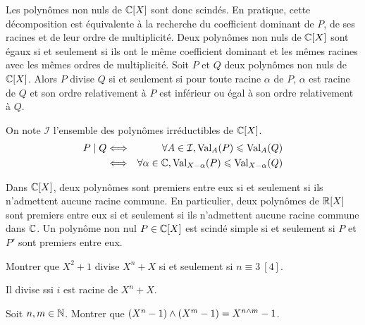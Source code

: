 \documentclass{magnolia}
\begin{document}
\begin{remarques}
\remarque Les polynômes non nuls de $\polyC$ sont donc scindés.
  \remarque En pratique, cette décomposition est équivalente à la recherche du
  coefficient dominant de $P$, de ses racines et de leur ordre de
  multiplicité.
  \remarque Deux polynômes non nuls de $\polyC$ sont égaux si et seulement si ils ont
  le même coefficient dominant et les mêmes racines avec les mêmes ordres de
  multiplicité.
\remarque Soit $P$ et $Q$ deux polynômes non nuls de $\polyC$. Alors $P$ divise
  $Q$ si et seulement si pour toute racine $\alpha$ de $P$, $\alpha$ est racine
  de $Q$ et son ordre relativement à $P$ est inférieur ou égal à son ordre
  relativement à $Q$.
  \begin{preuve} On note $\mathcal{I}$ l'ensemble des polynômes irréductibles de $\polyC$.
  \begin{eqnarray*}
  P\mid Q &\Longleftrightarrow & \forall A\in \mathcal{I}, {\rm Val}_A(P)\leqslant {\rm Val}_A(Q)\\
  &\Longleftrightarrow & \forall \alpha\in\mathbb{C}, {\rm Val}_{X-\alpha}(P)\leqslant {\rm Val}_{X-\alpha}(Q)
  \end{eqnarray*}
  \end{preuve}
\remarque Dans $\polyC$, deux polynômes sont premiers entre eux si
  et seulement si ils n'admettent aucune racine commune. En particulier, deux
  polynômes de $\polyR$ sont premiers entre eux si et seulement si ils
  n'admettent aucune racine commune dans $\mathbb{C}$.
\remarque Un polynôme non nul $P\in\polyC$ est scindé simple si et
  seulement si $P$ et $P'$ sont premiers entre eux.
\end{remarques}

\begin{exos}
  \exo Montrer que $X^2+1$ divise $X^n+X$ si et seulement si $n\equiv 3 \ [4]$.
  \begin{sol}
  Il divise ssi $i$ est racine de $X^n+X$.
  
  \end{sol}
  \exo Soit $n,m\in\mathbb{N}$. Montrer que $\left(X^n-1\right)\wedge\left(X^m-1\right)=X^{n\wedge m}-1$.
  \end{exos}
\end{document}
